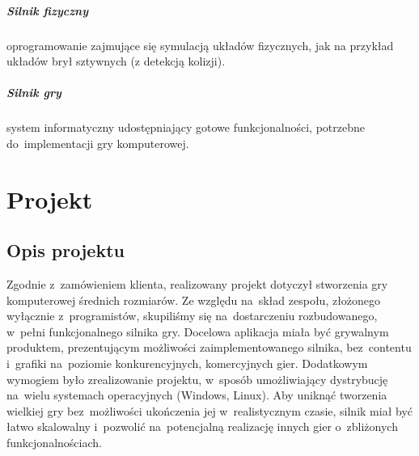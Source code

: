 \documentclass[licencjacka]{pracamgr}
\begin{document}
  \paragraph{Silnik fizyczny}
    oprogramowanie zajmujące się symulacją układów fizycznych, jak na przykład układów brył sztywnych (z detekcją kolizji).
  \paragraph{Silnik gry}
    system informatyczny udostępniający gotowe funkcjonalności, potrzebne do~implementacji gry komputerowej.

\chapter{Projekt}

  \section{Opis projektu}
    Zgodnie z~zamówieniem klienta, realizowany projekt dotyczył stworzenia gry komputerowej średnich rozmiarów.
    Ze względu na~skład zespołu, złożonego wyłącznie z~programistów, skupiliśmy się na~dostarczeniu rozbudowanego,
    w~pełni funkcjonalnego silnika gry. Docelowa aplikacja miała być grywalnym produktem, prezentującym możliwości
    zaimplementowanego silnika, bez~contentu i~grafiki na~poziomie konkurencyjnych, komercyjnych gier. Dodatkowym
    wymogiem było zrealizowanie projektu, w~sposób umożliwiający dystrybucję na~wielu systemach operacyjnych
    (Windows, Linux). Aby uniknąć tworzenia wielkiej gry bez~możliwości ukończenia jej w~realistycznym czasie,
    silnik miał być łatwo skalowalny i~pozwolić na~potencjalną realizację innych gier o~zbliżonych funkcjonalnościach.
\end{document}
